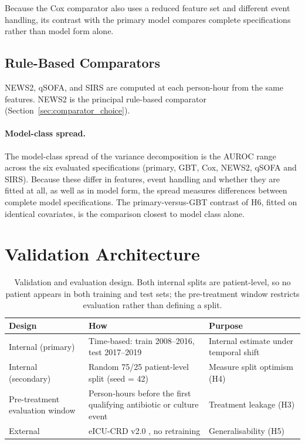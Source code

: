 Because the Cox comparator also uses a reduced feature set and different event
handling, its contrast with the primary model compares complete
specifications rather than model form alone.

\subsection{Rule-Based Comparators}

NEWS2, qSOFA, and SIRS are computed at each person-hour from the same features.
NEWS2 is the principal rule-based comparator
(Section~\ref{sec:comparator_choice}).

\paragraph{Model-class spread.} The model-class spread of the variance
decomposition is the AUROC range across the six evaluated specifications
(primary, GBT, Cox, NEWS2, qSOFA and SIRS). Because these differ in features,
event handling and whether they are fitted at all, as well as in model form,
the spread measures differences between complete model specifications. The
primary-versus-GBT contrast of H6, fitted on identical covariates, is the
comparison closest to model class alone.


\section{Validation Architecture}
\label{sec:validation}

\begin{table}[H]
    \centering\small
    \begin{tabular}{p{2.8cm}p{6.5cm}p{3.5cm}}
        \toprule
        \textbf{Design} & \textbf{How} & \textbf{Purpose} \\
        \midrule
        Internal (primary) & Time-based: train 2008--2016, test 2017--2019
        \cite{guo2022temporal} & Internal estimate under temporal shift \\
        Internal (secondary) & Random 75/25 patient-level split (seed = 42)
        & Measure split optimism (H4) \\
        Pre-treatment evaluation window & Person-hours before the first
        qualifying antibiotic or culture event \cite{kamran2024evaluation} &
        Treatment leakage (H3) \\
        External & eICU-CRD v2.0 \cite{pollard2018eicu}, no retraining
        & Generalisability (H5) \\
        \bottomrule
    \end{tabular}
    \caption{Validation and evaluation design. Both internal splits are
    patient-level, so no patient appears in both training and test sets; the
    pre-treatment window restricts evaluation rather than defining a split.}
    \label{tab:validation}
\end{table}


